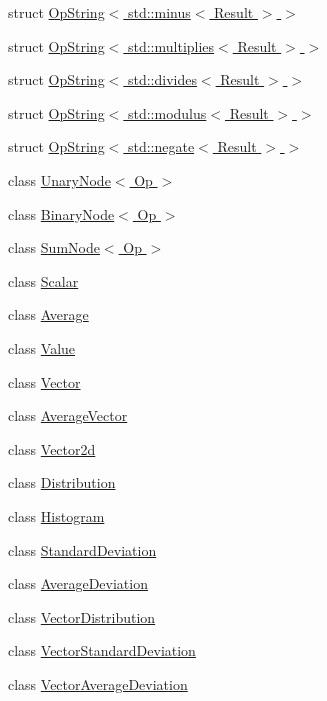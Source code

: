 \begin{DoxyCompactItemize}
\item 
struct \hyperlink{structStats_1_1OpString_3_01std_1_1minus_3_01Result_01_4_01_4}{OpString$<$ std::minus$<$ Result $>$ $>$}
\item 
struct \hyperlink{structStats_1_1OpString_3_01std_1_1multiplies_3_01Result_01_4_01_4}{OpString$<$ std::multiplies$<$ Result $>$ $>$}
\item 
struct \hyperlink{structStats_1_1OpString_3_01std_1_1divides_3_01Result_01_4_01_4}{OpString$<$ std::divides$<$ Result $>$ $>$}
\item 
struct \hyperlink{structStats_1_1OpString_3_01std_1_1modulus_3_01Result_01_4_01_4}{OpString$<$ std::modulus$<$ Result $>$ $>$}
\item 
struct \hyperlink{structStats_1_1OpString_3_01std_1_1negate_3_01Result_01_4_01_4}{OpString$<$ std::negate$<$ Result $>$ $>$}
\item 
class \hyperlink{classStats_1_1UnaryNode}{UnaryNode$<$ Op $>$}
\item 
class \hyperlink{classStats_1_1BinaryNode}{BinaryNode$<$ Op $>$}
\item 
class \hyperlink{classStats_1_1SumNode}{SumNode$<$ Op $>$}
\item 
class \hyperlink{classStats_1_1Scalar}{Scalar}
\item 
class \hyperlink{classStats_1_1Average}{Average}
\item 
class \hyperlink{classStats_1_1Value}{Value}
\item 
class \hyperlink{classStats_1_1Vector}{Vector}
\item 
class \hyperlink{classStats_1_1AverageVector}{AverageVector}
\item 
class \hyperlink{classStats_1_1Vector2d}{Vector2d}
\item 
class \hyperlink{classStats_1_1Distribution}{Distribution}
\item 
class \hyperlink{classStats_1_1Histogram}{Histogram}
\item 
class \hyperlink{classStats_1_1StandardDeviation}{StandardDeviation}
\item 
class \hyperlink{classStats_1_1AverageDeviation}{AverageDeviation}
\item 
class \hyperlink{classStats_1_1VectorDistribution}{VectorDistribution}
\item 
class \hyperlink{classStats_1_1VectorStandardDeviation}{VectorStandardDeviation}
\item 
class \hyperlink{classStats_1_1VectorAverageDeviation}{VectorAverageDeviation}
\item 

\end{DoxyCompactItemize}
